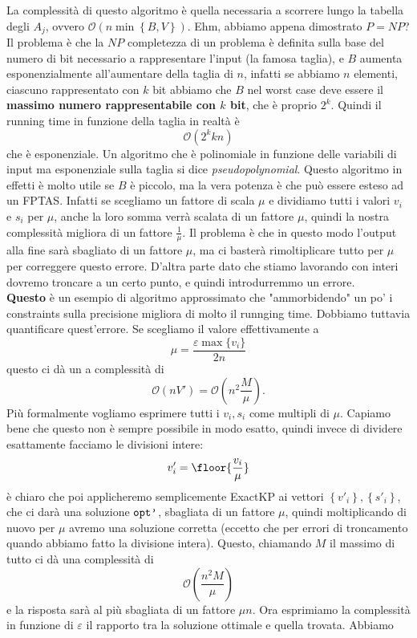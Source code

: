 \documentclass[11pt]{scrartcl}
\newcommand{\bigo}{\mathcal{O}}
\begin{document}
	La complessità di questo algoritmo è quella necessaria a scorrere lungo la tabella degli $A_j$, ovvero $\bigo\left(n\min\left\{B,V\right\}\right)$. Ehm, abbiamo appena dimostrato $P=NP$?\\
	Il problema è che la $NP$ completezza di un problema è definita sulla base del numero di bit necessario a rappresentare l'input (la famosa taglia), e $B$ aumenta esponenzialmente all'aumentare della taglia di $n$, infatti se abbiamo $n$ elementi, ciascuno rappresentato con $k$ bit abbiamo che $B$ nel worst case deve essere il \textbf{massimo numero rappresentabile con $k$ bit}, che è proprio $2^k$. Quindi il running time in funzione della taglia in realtà è
	$$\bigo\left(2^kkn\right)$$
	che è esponenziale. Un algoritmo che è polinomiale in funzione delle variabili di input ma esponenziale sulla taglia si dice \textit{pseudopolynomial}. Questo algoritmo in effetti è molto utile se $B$ è piccolo, ma la vera potenza è che può essere esteso ad un FPTAS. Infatti se scegliamo un fattore di scala $\mu$ e dividiamo tutti i valori $v_i$ e $s_i$ per $\mu$, anche la loro somma verrà scalata di un fattore $\mu$, quindi la nostra complessità migliora di un fattore $\frac{1}{\mu}$. Il problema è che in questo modo l'output alla fine sarà sbagliato di un fattore $\mu$, ma ci basterà rimoltiplicare tutto per $\mu$ per correggere questo errore. D'altra parte dato che stiamo lavorando con interi dovremo troncare a un certo punto, e quindi introdurremmo un errore. \\
	\textbf{Questo} è un esempio di algoritmo approssimato che "ammorbidendo" un po' i constraints sulla precisione migliora di molto il runnging time. Dobbiamo tuttavia quantificare quest'errore. Se scegliamo il valore effettivamente a
	$$\mu=\frac{\varepsilon \max\{v_i\}}{2n}$$
	questo ci dà un a complessità di 
	$$\bigo\left(nV'\right)=\bigo\left(n^2\frac{M}{\mu}\right).$$
	Più formalmente vogliamo esprimere tutti i $v_i,s_i$ come multipli di $\mu$. Capiamo bene che questo non è sempre possibile in modo esatto, quindi invece di dividere esattamente facciamo le divisioni intere:
	$$v'_i=\floor{\frac{v_i}{\mu}}$$
	è chiaro che poi applicheremo semplicemente ExactKP ai vettori $\left\{v'_i\right\},\left\{s'_i\right\}$, che ci darà una soluzione $\verb*|opt'|$, sbagliata di un fattore $\mu$, quindi moltiplicando di nuovo per $\mu$ avremo una soluzione corretta (eccetto che per errori di troncamento quando abbiamo fatto la divisione intera). Questo, chiamando $M$ il massimo di tutto ci dà una complessità di 
	$$\bigo\left(\frac{n^2M}{\mu}\right)$$
	e la risposta sarà al più sbagliata di un fattore $\mu n$. Ora esprimiamo la complessità in funzione di $\varepsilon$ il rapporto tra la soluzione ottimale e quella trovata. Abbiamo
\end{document}
